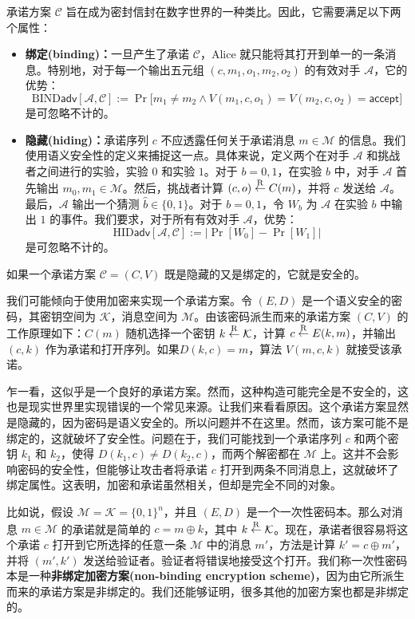 承诺方案 $\mathcal{C}$ 旨在成为密封信封在数字世界的一种类比。因此，它需要满足以下两个属性：
\begin{itemize}
	\item \textbf{绑定(binding)：}一旦产生了承诺 $\mathcal{C}$，Alice 就只能将其打开到单一的一条消息。特别地，对于每一个输出五元组 $(c,m_1,o_1,m_2,o_2)$ 的有效对手 $\mathcal{A}$，它的优势：
	\[
	\mathrm{BIND}\mathsf{adv}[\mathcal{A},\mathcal{C}]:=
	\Pr\big[m_1\neq m_2\land V(m_1,c,o_1)=V(m_2,c,o_2)=\mathsf{accept}\big]
	\]
	是可忽略不计的。
	\item \textbf{隐藏(hiding)：}承诺序列 $c$ 不应透露任何关于承诺消息 $m\in\mathcal{M}$ 的信息。我们使用语义安全性的定义来捕捉这一点。具体来说，定义两个在对手 $\mathcal{A}$ 和挑战者之间进行的实验，实验 $0$ 和实验 $1$。对于 $b=0,1$，在实验 $b$ 中，对手 $\mathcal{A}$ 首先输出 $m_0,m_1\in\mathcal{M}$。然后，挑战者计算 $(c,o)\overset{\rm R}\leftarrow C(m)$，并将 $c$ 发送给 $\mathcal{A}$。最后，$\mathcal{A}$ 输出一个猜测 $\hat{b}\in\{0,1\}$。对于 $b=0,1$，令 $W_b$ 为 $\mathcal{A}$ 在实验 $b$ 中输出 $1$ 的事件。我们要求，对于所有有效对手 $\mathcal{A}$，优势：
	\[
	\mathrm{HID}\mathsf{adv}[\mathcal{A},\mathcal{C}]:=
	\Big\lvert
	\Pr[W_0]-\Pr[W_1]
	\Big\rvert
	\]
	是可忽略不计的。
\end{itemize}

\begin{definition}\label{def:8-8}
如果一个承诺方案 $\mathcal{C}=(C,V)$ 既是隐藏的又是绑定的，它就是安全的。
\end{definition}

\begin{remark}[加密可能是非绑定的]\label{remark:8-1}
我们可能倾向于使用加密来实现一个承诺方案。令 $(E,D)$ 是一个语义安全的密码，其密钥空间为 $\mathcal{K}$，消息空间为 $\mathcal{M}$。由该密码派生而来的承诺方案 $(C,V)$ 的工作原理如下：$C(m)$ 随机选择一个密钥 $k\overset{\rm R}\leftarrow\mathcal{K}$，计算 $c\overset{\rm R}\leftarrow E(k,m)$，并输出 $(c,k)$ 作为承诺和打开序列。如果$D(k,c)=m$，算法 $V(m,c,k)$ 就接受该承诺。

乍一看，这似乎是一个良好的承诺方案。然而，这种构造可能完全是不安全的，这也是现实世界里实现错误的一个常见来源。让我们来看看原因。这个承诺方案显然是隐藏的，因为密码是语义安全的。所以问题并不在这里。然而，该方案可能不是绑定的，这就破坏了安全性。问题在于，我们可能找到一个承诺序列 $c$ 和两个密钥 $k_1$ 和 $k_2$，使得 $D(k_1,c)\neq D(k_2,c)$，而两个解密都在 $\mathcal{M}$ 上。这并不会影响密码的安全性，但能够让攻击者将承诺 $c$ 打开到两条不同消息上，这就破坏了绑定属性。这表明，加密和承诺虽然相关，但却是完全不同的对象。

比如说，假设 $\mathcal{M}=\mathcal{K}=\{0,1\}^n$，并且 $(E,D)$ 是一个一次性密码本。那么对消息 $m\in\mathcal{M}$ 的承诺就是简单的 $c=m\oplus k$，其中 $k\overset{\rm R}\leftarrow\mathcal{K}$。现在，承诺者很容易将这个承诺 $c$ 打开到它所选择的任意一条 $\mathcal{M}$ 中的消息 $m'$，方法是计算 $k'=c\oplus m'$，并将 $(m',k')$ 发送给验证者。验证者将错误地接受这个打开。我们称一次性密码本是一种\textbf{非绑定加密方案(non-binding encryption scheme)}，因为由它所派生而来的承诺方案是非绑定的。我们还能够证明，很多其他的加密方案也都是非绑定的。
\end{remark}

